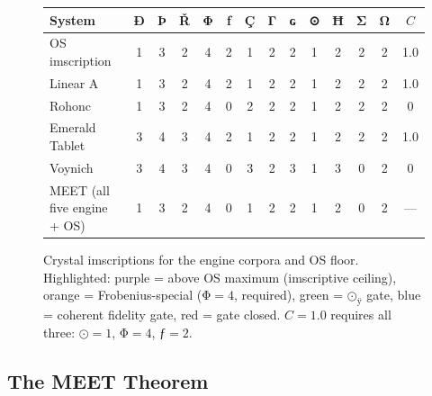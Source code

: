 \documentclass[12pt,a4paper]{article}
\newcommand{\ig}[1]{{\igprimfont #1}}
\begin{document}
\begin{figure}[htbp]
\centering
\setlength{\tabcolsep}{3.5pt}
\small
\begin{tabular}{l *{12}{c} c}
\toprule
\textbf{System} & \ig{Ð} & \ig{Þ} & \ig{Ř} & \ig{Φ} & \ig{ƒ} & \ig{Ç} & \ig{Γ} & \ig{ɢ} & \ig{⊙} & \ig{Ħ} & \ig{Σ} & \ig{Ω} & $C$ \\
\midrule
\rowcolor{oscol!12}
OS imscription   & 1 & 3 & 2 & \cellcolor{frobcol!22}4 & \cellcolor{logcol!18}2 & 1 & 2 & 2 & \cellcolor{green!22}1 & 2 & 2 & 2 & 1.0 \\
\rowcolor{lineara!10}
Linear A         & 1 & 3 & 2 & \cellcolor{frobcol!22}4 & \cellcolor{logcol!18}2 & 1 & 2 & 2 & \cellcolor{green!22}1 & 2 & 2 & 2 & 1.0 \\
\rowcolor{rohonc!10}
Rohonc           & 1 & 3 & 2 & \cellcolor{frobcol!22}4 & \cellcolor{red!18}0   & \cellcolor{yellow!28}2 & 2 & 2 & \cellcolor{green!22}1 & 2 & 2 & 2 & 0 \\
\rowcolor{emerald!10}
Emerald Tablet   & \cellcolor{purple!18}3 & \cellcolor{purple!18}4 & \cellcolor{purple!18}3 & \cellcolor{frobcol!22}4 & \cellcolor{logcol!18}2 & 1 & 2 & 2 & \cellcolor{green!22}1 & 2 & 2 & 2 & 1.0 \\
\rowcolor{voynich!10}
Voynich          & \cellcolor{purple!18}3 & \cellcolor{purple!18}4 & \cellcolor{purple!18}3 & \cellcolor{frobcol!22}4 & \cellcolor{red!18}0 & \cellcolor{orange!22}3 & 2 & \cellcolor{orange!22}3 & \cellcolor{green!22}1 & \cellcolor{orange!22}3 & \cellcolor{red!18}0 & 2 & 0 \\
\midrule
\rowcolor{gray!8}
MEET (all five engine + OS) & 1 & 3 & 2 & 4 & 0 & 1 & 2 & 2 & 1 & 2 & 0 & 2 & --- \\
\bottomrule
\end{tabular}
\caption{Crystal imscriptions for the engine corpora and OS floor. Highlighted: \colorbox{purple!18}{purple} = above OS maximum (imscriptive ceiling), \colorbox{frobcol!22}{orange} = Frobenius-special ($\text{Φ}=4$, required), \colorbox{green!22}{green} = $\text{⊙}_\text{ÿ}$ gate, \colorbox{logcol!18}{blue} = coherent fidelity gate, \colorbox{red!18}{red} = gate closed. $C=1.0$ requires all three: $\text{⊙}=1$, $\text{Φ}=4$, $\text{ƒ}=2$.}
\label{fig:imscriptions}
\end{figure}

\subsection{The MEET Theorem}
\end{document}
